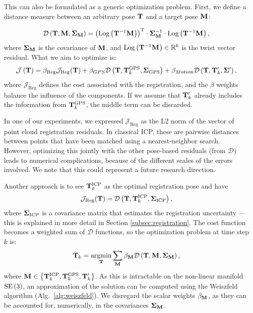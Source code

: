 This can also be formulated as a generic optimization problem. First, we define a distance measure between an arbitrary pose $\mathbf{T}_{}$ and a target pose $\mathbf{M}_{}$:

\newcommand{\customres}{\Log{\pose^{-1} \Mtx{}}}
\newcommand{\dfunc}[1]{\mathcal{D}\left({#1}\right)}
\newcommand{\costreg}{\mathcal{J}_{\text{Reg}}}
\newcommand{\betareg}{\beta_{\text{Reg}}}
\newcommand{\betagps}{\beta_{\text{GPS}}}
\newcommand{\xireg}{\xi_{\text{Reg}}}
\newcommand{\xiicp}{\xi_{\text{ICP}}}
\newcommand{\xigps}{\xi_{\text{GPS}}}
\begin{equation}
	\label{eq:mah-distance}
	\dfunc{\pose, \Mtx{}, \CovM} = \transpose{\left(\customres\right)} \cdot \CovM^{-1} \cdot \customres
	\comma
\end{equation}
where $\mathbf{\Sigma}_{\mathbf{M}}$ is the covariance of $\mathbf{M}_{}$, and $\customres \in \RR^6$ is the twist vector residual. What we aim to optimize is:
\begin{equation}
	\mathcal{J}\left(\pose\right) =
	\betareg \costreg(\pose) +
	\beta_{GPS} \dfunc{\pose, \tkgps, \covgps} +
	\beta_{Motion} \dfunc{\pose, \pose_k', \matx{\Sigma}'}
	\comma
\end{equation}
where $\costreg$ defines the cost associated with the registration, and the $\beta$ weights balance the influence of the components. If we assume that $\mathbf{T}_k'$ already includes the information from $\mathbf{T}_k^{\text{GPS}}$, the middle term can be discarded.

In one of our experiments, we expressed $\costreg$ as the L2 norm of the vector of point cloud registration residuals. In classical ICP, these are pairwise distances between points that have been matched using a nearest-neighbor search. However, optimizing this jointly with the other pose-based residuals (from $\mathcal{D}$) leads to numerical complications, because of the different scales of the errors involved. We note that this could represent a future research direction.

Another approach is to see $\mathbf{T}_k^{\text{ICP}}$ as the optimal registration pose and have
\begin{equation}
	\costreg(\pose) = \dfunc{\pose, \tkicp, \covicp}
	\comma
\end{equation}
where $\mathbf{\Sigma}_{\text{ICP}}$ is a covariance matrix that estimates the registration uncertainty --- this is explained in more detail in Section \ref{subsec:registration}. The cost function becomes a weighted sum of $\mathcal{D}$ functions, so the optimization problem at time step $k$ is:
\newcommand{\betaM}{\beta_{\Mtx{}}}
\begin{equation}
	\label{eq:costfn}
	\pose_k = \underset{\matx{T}}{\text{argmin}}
	\sum_{\Mtx{}} \betaM\dfunc{\pose, \Mtx{}, \CovM}
	\comma
\end{equation}
where $\mathbf{M}_{} \in \left\{ \mathbf{T}_k^{\text{ICP}}, \mathbf{T}_k^{\text{GPS}}, \mathbf{T}_k'\right\}$.
As this is intractable on the non-linear manifold $\operatorname{SE}\left(3\right)$, an approximation of the solution can be computed using the Weiszfeld algorithm (Alg.~\ref{alg:weiszfeld}). We disregard the scalar weights $\betaM$, as they can be accounted for, numerically, in the covariances $\mathbf{\Sigma}_{\mathbf{M}}$.

